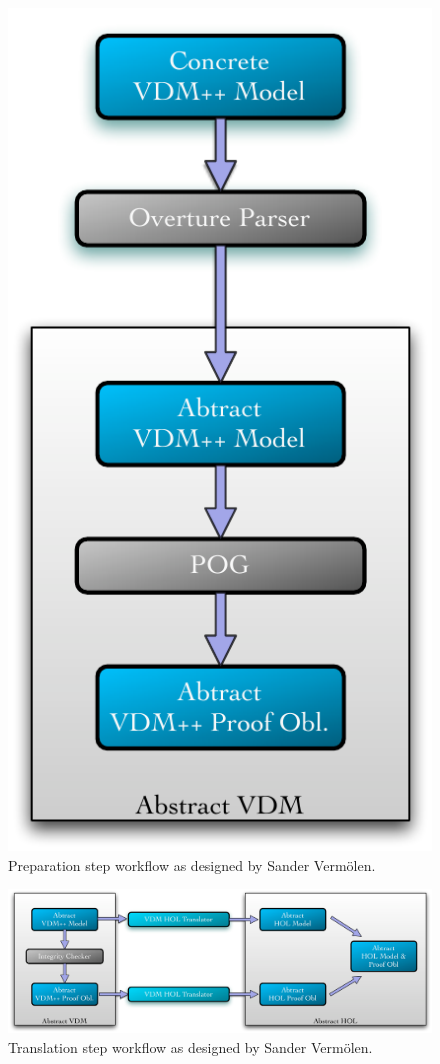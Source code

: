 \documentclass[]{article}
\begin{document}
\begin{figure}
  \begin{center}
  \includegraphics[height=.5\textheight]{images/pic_preparation.pdf}
  \caption[Preparation workflow]{Preparation step workflow as designed by Sander Verm\"olen.}
  \label{fig:arch_preparation}
  \end{center}
\end{figure}

\begin{figure}
  \begin{center}
  \includegraphics[width=\textwidth]{images/pic_translation.pdf}
  \caption[Translation workflow]{Translation step workflow as designed by Sander Verm\"olen.}
  \label{fig:arch_translation}
  \end{center}
\end{figure}
\end{document}
